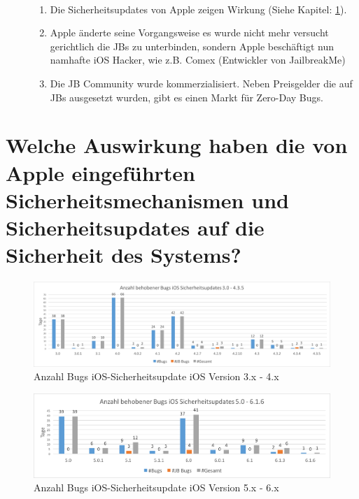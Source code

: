 \begin{description}
    \item[\parbox{\textwidth} {Die Ursachen hierfür sind}]~\par
    \begin{enumerate}
        \item Die Sicherheitsupdates von Apple zeigen Wirkung (Siehe Kapitel: \ref{sec:Frage2}).
        \item Apple änderte seine Vorgangsweise es wurde nicht mehr versucht gerichtlich die JBs zu unterbinden, sondern Apple beschäftigt nun namhafte iOS Hacker, wie z.B. Comex (Entwickler von JailbreakMe)
        \item Die JB Community wurde kommerzialisiert. Neben Preisgelder die auf JBs ausgesetzt wurden, gibt es einen Markt für Zero-Day Bugs. 
    \end{enumerate}
\end{description} 

\section{Welche Auswirkung haben die von Apple eingeführten Sicherheitsmechanismen und Sicherheitsupdates auf die Sicherheit des Systems?}
\label{sec:Frage2}

\begin{figure}[htbp]
        \centering
                \includegraphics[scale=0.4]{Bilder/iOSSicherheitsupdate3.png}
        \caption{Anzahl Bugs iOS-Sicherheitsupdate iOS Version 3.x - 4.x}
        \label{fig:AnalyseiOSSicherheitsupdate3}
\end{figure}
     
\begin{figure}[htbp]
        \centering
                \includegraphics[scale=0.55]{Bilder/iOSSicherheitsupdate5.png}
        \caption{Anzahl Bugs iOS-Sicherheitsupdate iOS Version 5.x - 6.x}
        \label{fig:AnalyseiOSSicherheitsupdate5}
\end{figure}

